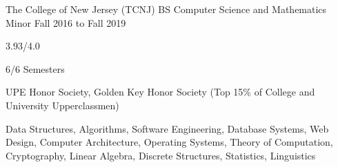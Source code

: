 
\begin{cventry}
    {The College of New Jersey (TCNJ)}
    {BS Computer Science and Mathematics Minor}
    {Fall 2016 to Fall 2019}{}{}
    \begin{cvitems}
        \item{} 3.93/4.0
        \item{} 6/6 Semesters
        \item{} UPE Honor Society, Golden Key Honor Society (Top 15\% of College and University Upperclassmen)
        \item{} Data Structures, Algorithms, Software Engineering, Database Systems, Web Design, Computer Architecture, Operating Systems, Theory of Computation, Cryptography, Linear Algebra, Discrete Structures, Statistics, Linguistics
    \end{cvitems}
\end{cventry}
